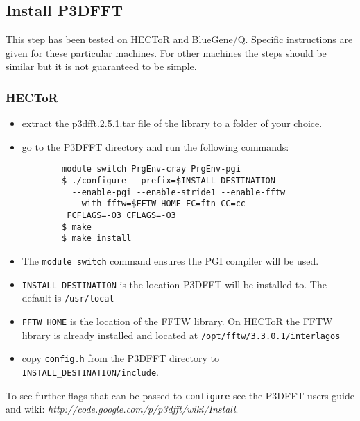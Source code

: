 \documentclass[12pt,a4paper]{article}
\begin{document}
\subsection{Install P3DFFT}
  This step has been tested on HECToR and BlueGene/Q. Specific instructions are given for these particular machines. For other machines the steps should be similar but it is not guaranteed to be simple.

\subsubsection{HECToR}
  \begin{itemize}
    \item extract the p3dfft.2.5.1.tar file of the library to a folder of your choice.
    \item go to the P3DFFT directory and run the following commands:
      \begin{verbatim}
        module switch PrgEnv-cray PrgEnv-pgi
        $ ./configure --prefix=$INSTALL_DESTINATION
          --enable-pgi --enable-stride1 --enable-fftw 
          --with-fftw=$FFTW_HOME FC=ftn CC=cc
         FCFLAGS=-O3 CFLAGS=-O3
        $ make
        $ make install
      \end{verbatim}
    \item The \texttt{module switch} command ensures the PGI compiler will be used.
    \item \texttt{INSTALL\_DESTINATION} is the location P3DFFT will be installed to. The default is \texttt{/usr/local}
    \item \texttt{FFTW\_HOME} is the location of the FFTW library. On HECToR the FFTW library is already installed and located at \texttt{/opt/fftw/3.3.0.1/interlagos}
    \item copy \texttt{config.h} from the P3DFFT directory to \texttt{INSTALL\_DESTINATION/include}.
  \end{itemize}

To see further flags that can be passed to \texttt{configure} see the P3DFFT users guide and wiki: \textit{http://code.google.com/p/p3dfft/wiki/Install}.
\end{document}
